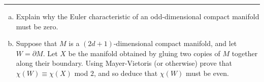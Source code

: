 \documentclass[letterpaper, 12pt]{article}
\begin{document}
\noindent\rule{7in}{2.8pt}
\begin{problem}{2}
\begin{enumerate}[(a)]
\item Explain why the Euler characteristic of an odd-dimensional compact manifold must be zero. 
\item Suppose that \(M\) is a \((2d+1)\)-dimensional compact manifold, and let \(W=\partial M\). Let \(X\) be the manifold obtained by gluing two copies of \(M\) together along their boundary. Using Mayer-Vietoris (or otherwise) prove that \(\chi(W)\equiv \chi(X)\) mod \(2\), and so deduce that \(\chi(W)\) must be even.
\end{enumerate}
\end{problem}
\end{document}
